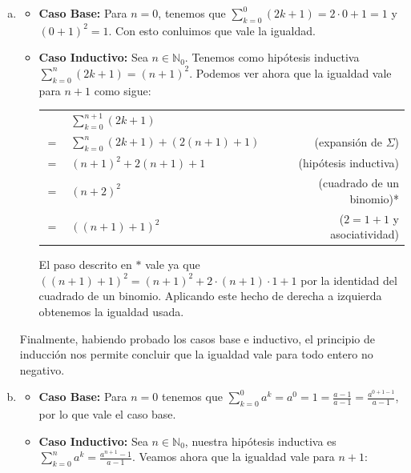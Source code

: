 \begin{enumerate}[(a)]
    \item \begin{itemize}
        \item \textbf{Caso Base:} Para $n = 0$, tenemos que $\sum_{k=0}^{0} (2k + 1) = 2 \cdot 0 + 1 = 1$ y ${(0 + 1)}^2 = 1$.
              Con esto conluimos que vale la igualdad.
        \item \textbf{Caso Inductivo:} Sea $n \in \mathbb{N}_0$.
              Tenemos como hipótesis inductiva $\sum_{k=0}^{n} (2k + 1) = {(n+1)}^2$.
              Podemos ver ahora que la igualdad vale para $n + 1$ como sigue:

              \begin{tabular}{|l l r}
                 & $\sum_{k=0}^{n + 1} (2k + 1)$ & \\
                $=$ & $\sum_{k=0}^{n} (2k + 1) + (2(n+1) + 1)$ & (expansión de $\Sigma$) \\
                $=$ & ${(n+1)}^2 + 2(n+1) + 1$ & (hipótesis inductiva) \\
                $=$ & ${(n+2)}^2$ & (cuadrado de un binomio)* \\
                $=$ & ${((n + 1) + 1)}^2$ & ($2 = 1 + 1$ y asociatividad) \\
              \end{tabular}

              El paso descrito en $*$ vale ya que ${((n+1)+1)}^2 = {(n+1)}^2 + 2 \cdot (n+1) \cdot 1 + 1$ por la identidad del cuadrado de un binomio.
              Aplicando este hecho de derecha a izquierda obtenemos la igualdad usada.

    \end{itemize}
        Finalmente, habiendo probado los casos base e inductivo, el principio de inducción nos permite concluir que la igualdad vale para todo entero no negativo.

    \item \begin{itemize}
        \item \textbf{Caso Base:} Para $n=0$ tenemos que $\sum_{k=0}^{0} a^k = a^0 = 1 = \frac{a - 1}{a - 1} = \frac{a^{0+1 - 1}}{a - 1}$, por lo que vale el caso base.
        \item \textbf{Caso Inductivo:} Sea $n \in \mathbb{N}_0$, nuestra hipótesis inductiva es $\sum_{k=0}^{n} a^k = \frac{a^{n+1} - 1}{a - 1}$.
              Veamos ahora que la igualdad vale para $n+1$:


\end{itemize}
\end{enumerate}
